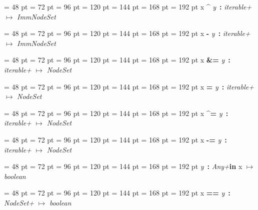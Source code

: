 {{{{\par \noindent  \leftskip = 48 pt  \leftmargini = 72 pt  \leftmarginii = 96 pt  \leftmarginiii = 120 pt  \leftmarginiv = 144 pt  \leftmarginv = 168 pt  \leftmarginvi = 192 pt x {\large {\bf {\textasciicircum}\/}} {\em y\/}~{\bf :}  {\em iterable+\/} \(\mapsto \)  {\em ImmNodeSet\/}\par}
{\par \noindent  \leftskip = 48 pt  \leftmargini = 72 pt  \leftmarginii = 96 pt  \leftmarginiii = 120 pt  \leftmarginiv = 144 pt  \leftmarginv = 168 pt  \leftmarginvi = 192 pt x {\large {\bf -\/}} {\em y\/}~{\bf :}  {\em iterable+\/} \(\mapsto \)  {\em ImmNodeSet\/}\par}
{\par \noindent  \leftskip = 48 pt  \leftmargini = 72 pt  \leftmarginii = 96 pt  \leftmarginiii = 120 pt  \leftmarginiv = 144 pt  \leftmarginv = 168 pt  \leftmarginvi = 192 pt x {\large {\bf {\&}=\/}} {\em y\/}~{\bf :}  {\em iterable+\/} \(\mapsto \)  {\em NodeSet\/}\par}
{\par \noindent  \leftskip = 48 pt  \leftmargini = 72 pt  \leftmarginii = 96 pt  \leftmarginiii = 120 pt  \leftmarginiv = 144 pt  \leftmarginv = 168 pt  \leftmarginvi = 192 pt x {\large {\bf {\textbar}=\/}} {\em y\/}~{\bf :}  {\em iterable+\/} \(\mapsto \)  {\em NodeSet\/}\par}
{\par \noindent  \leftskip = 48 pt  \leftmargini = 72 pt  \leftmarginii = 96 pt  \leftmarginiii = 120 pt  \leftmarginiv = 144 pt  \leftmarginv = 168 pt  \leftmarginvi = 192 pt x {\large {\bf {\textasciicircum}=\/}} {\em y\/}~{\bf :}  {\em iterable+\/} \(\mapsto \)  {\em NodeSet\/}\par}
{\par \noindent  \leftskip = 48 pt  \leftmargini = 72 pt  \leftmarginii = 96 pt  \leftmarginiii = 120 pt  \leftmarginiv = 144 pt  \leftmarginv = 168 pt  \leftmarginvi = 192 pt x {\large {\bf -=\/}} {\em y\/}~{\bf :}  {\em iterable+\/} \(\mapsto \)  {\em NodeSet\/}\par}
{\par \noindent  \leftskip = 48 pt  \leftmargini = 72 pt  \leftmarginii = 96 pt  \leftmarginiii = 120 pt  \leftmarginiv = 144 pt  \leftmarginv = 168 pt  \leftmarginvi = 192 pt {\em y\/}~{\bf :}  {\em Any+\/}{\large  {\bf in\/} }x \(\mapsto \)  {\em boolean\/}\par}
{\par \noindent  \leftskip = 48 pt  \leftmargini = 72 pt  \leftmarginii = 96 pt  \leftmarginiii = 120 pt  \leftmarginiv = 144 pt  \leftmarginv = 168 pt  \leftmarginvi = 192 pt x {\large {\bf ==\/}} {\em y\/}~{\bf :}  {\em NodeSet+\/} \(\mapsto \)  {\em boolean\/}\par}
}}}

